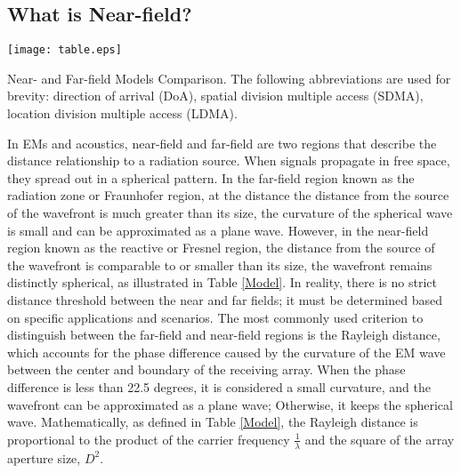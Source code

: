 \documentclass[10pt,journal,twocolumn,twoside]{IEEEtran} %
\begin{document}
\subsection{What is Near-field?}
\begin{table*}[htbp]
       \centering
       \texttt{[image: table.eps]}
       \caption{Near- and Far-field Models Comparison. The following abbreviations are used for brevity: direction of arrival (DoA),  spatial division multiple access (SDMA), location division multiple access (LDMA).}
       \label{Model}
\end{table*}
In EMs and acoustics, near-field and far-field are two regions that describe the distance relationship to a radiation source. 
When signals propagate in free space, they spread out in a spherical pattern. In the far-field region known as the radiation zone or Fraunhofer region, at the distance the distance from the source of the wavefront is much greater than its size, the curvature of the spherical wave is small and can be approximated as a plane wave. 
However, in the near-field region known as the reactive or Fresnel region, the distance from the source of the wavefront is comparable to or smaller than its size, the wavefront remains distinctly spherical, as illustrated in Table \ref{Model}.
In reality, there is no strict distance threshold between the near and far fields; it must be determined based on specific applications and scenarios. 
The most commonly used criterion to distinguish between the far-field and near-field regions is the Rayleigh distance, which accounts for the phase difference caused by the curvature of the EM wave between the center and boundary of the receiving array.
 When the phase difference is less than 22.5 degrees, it is considered a small curvature, and the wavefront can be approximated as a plane wave; 
Otherwise, it keeps the spherical wave. Mathematically, as defined in Table \ref{Model}, the Rayleigh distance is proportional to the product of the carrier frequency $\frac{1}{\lambda}$ and the square of the array aperture size, $D^2$. 
\end{document}
